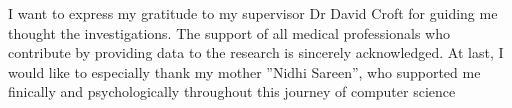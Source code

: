 I want to express my gratitude to my supervisor Dr David Croft for guiding me thought the investigations. The support of all medical professionals who contribute by providing data to the research is sincerely acknowledged. At last, I would like to especially thank my mother ”Nidhi Sareen”, who supported me finically and psychologically throughout this journey of computer science